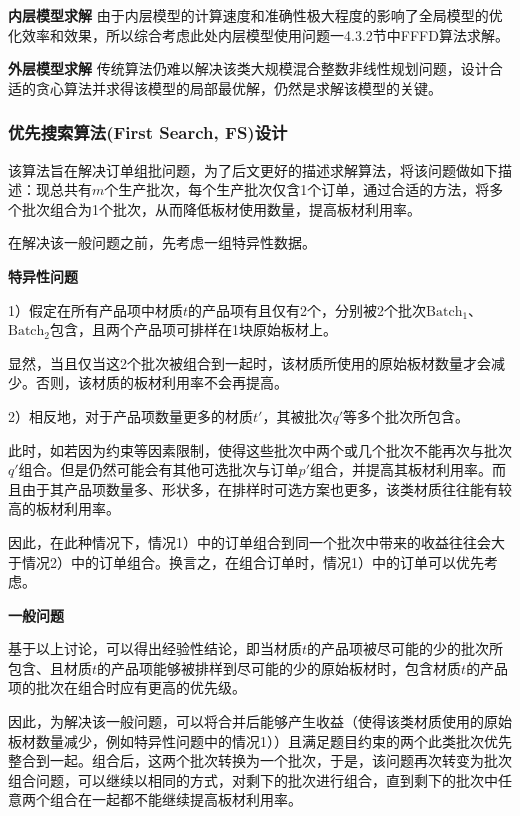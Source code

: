 \documentclass[bwprint]{gmcmthesis}
\begin{document}
	\textbf{内层模型求解} \quad 由于内层模型的计算速度和准确性极大程度的影响了全局模型的优化效率和效果，所以综合考虑此处内层模型使用问题一4.3.2节中FFFD算法求解。
	
	\textbf{外层模型求解} \quad 传统算法仍难以解决该类大规模混合整数非线性规划问题，设计合适的贪心算法并求得该模型的局部最优解，仍然是求解该模型的关键。

\subsubsection{优先搜索算法(First Search, FS)设计}
该算法旨在解决订单组批问题，为了后文更好的描述求解算法，将该问题做如下描述：现总共有$m$个生产批次，每个生产批次仅含1个订单，通过合适的方法，将多个批次组合为1个批次，从而降低板材使用数量，提高板材利用率。

在解决该一般问题之前，先考虑一组特异性数据。

\textbf{特异性问题}

1）假定在所有产品项中材质$t$的产品项有且仅有2个，分别被2个批次$\text{Batch}_1$、$\text{Batch}_2$包含，且两个产品项可排样在1块原始板材上。

显然，当且仅当这2个批次被组合到一起时，该材质所使用的原始板材数量才会减少。否则，该材质的板材利用率不会再提高。

2）相反地，对于产品项数量更多的材质$t'$，其被批次$q'$等多个批次所包含。

此时，如若因为约束等因素限制，使得这些批次中两个或几个批次不能再次与批次$q'$组合。但是仍然可能会有其他可选批次与订单$p'$组合，并提高其板材利用率。而且由于其产品项数量多、形状多，在排样时可选方案也更多，该类材质往往能有较高的板材利用率。

因此，在此种情况下，情况1）中的订单组合到同一个批次中带来的收益往往会大于情况2）中的订单组合。换言之，在组合订单时，情况1）中的订单可以优先考虑。

\textbf{一般问题}

基于以上讨论，可以得出经验性结论，即当材质$t$的产品项被尽可能的少的批次所包含、且材质$t$的产品项能够被排样到尽可能的少的原始板材时，包含材质$t$的产品项的批次在组合时应有更高的优先级。

因此，为解决该一般问题，可以将合并后能够产生收益（使得该类材质使用的原始板材数量减少，例如特异性问题中的情况1））且满足题目约束的两个此类批次优先整合到一起。组合后，这两个批次转换为一个批次，于是，该问题再次转变为批次组合问题，可以继续以相同的方式，对剩下的批次进行组合，直到剩下的批次中任意两个组合在一起都不能继续提高板材利用率。
\end{document}
